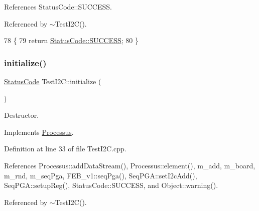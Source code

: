 References Status\+Code\+::\+S\+U\+C\+C\+E\+SS.



Referenced by $\sim$\+Test\+I2\+C().


\begin{DoxyCode}
78                                \{  
79   \textcolor{keywordflow}{return} \hyperlink{classStatusCode_a6f565cbeadc76d14c72f047e5e85eb4badd0da38d3ba0d922efd1f4619bc37ad8}{StatusCode::SUCCESS};
80 \}
\end{DoxyCode}
\mbox{\label{classTestI2C_a3f928813a5e26e0f9b6d851e16781a33}} 
\subsubsection{\texorpdfstring{initialize()}{initialize()}}
{\footnotesize\ttfamily \hyperlink{classStatusCode}{Status\+Code} Test\+I2\+C\+::initialize (\begin{DoxyParamCaption}{ }\end{DoxyParamCaption})\hspace{0.3cm}{\ttfamily [virtual]}}



Destructor. 



Implements \hyperlink{classProcessus_aee88ad7b77ae7319cf8b128e9dd2ea11}{Processus}.



Definition at line 33 of file Test\+I2\+C.\+cpp.



References Processus\+::add\+Data\+Stream(), Processus\+::element(), m\+\_\+add, m\+\_\+board, m\+\_\+rnd, m\+\_\+seq\+Pga, F\+E\+B\+\_\+v1\+::seq\+Pga(), Seq\+P\+G\+A\+::set\+I2c\+Add(), Seq\+P\+G\+A\+::setup\+Reg(), Status\+Code\+::\+S\+U\+C\+C\+E\+SS, and Object\+::warning().



Referenced by $\sim$\+Test\+I2\+C().


